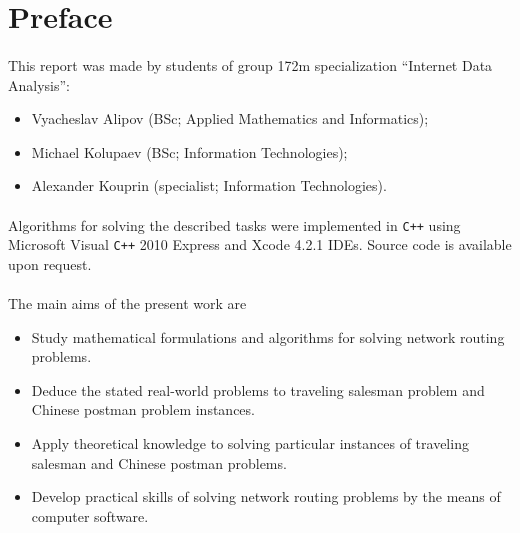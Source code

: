 \section{Preface}

\paragraph{}
	This report was made by students of group 172m specialization ``Internet Data Analysis'':

\begin{itemize}
	\item Vyacheslav Alipov (BSc; Applied Mathematics and Informatics);
	\item Michael Kolupaev (BSc; Information Technologies);
	\item Alexander Kouprin (specialist; Information Technologies).
\end{itemize}

\paragraph{}
	Algorithms for solving the described tasks were implemented in \verb!C++! using Microsoft Visual \verb!C++! 2010 Express and Xcode 4.2.1 IDEs. Source code is available upon request.

\paragraph{}
	The main aims of the present work are 
\begin{itemize}
	\item Study mathematical formulations and algorithms for solving network routing problems.
	\item Deduce the stated real-world problems to traveling salesman problem and Chinese postman problem instances.
	\item Apply theoretical knowledge to solving particular instances of traveling salesman and Chinese postman problems.
	\item Develop practical skills of solving network routing problems by the means of computer software.
\end{itemize}

